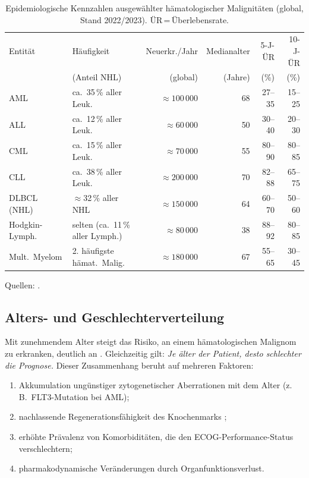 ﻿\documentclass[12pt,a4paper]{article}
\theoremstyle{definition}
\begin{document}
\begin{table}
\centering
\caption{Epidemiologische Kennzahlen ausgewählter hämatologischer Malignitäten
  (global, Stand 2022/2023). ÜR\,=\,Überlebensrate.}
\label{tab:epidemiologie}
\begin{tabular}{@{}llrrrr@{}}
\toprule
Entität & Häufigkeit & Neuerkr./Jahr & Medianalter & 5-J-ÜR & 10-J-ÜR \\
        & (Anteil NHL) & (global) & (Jahre) & (\%) & (\%) \\
\midrule
AML           & ca.\ 35\,\% aller Leuk. & $\approx 100\,000$ & 68 & 27--35 & 15--25 \\
ALL           & ca.\ 12\,\% aller Leuk. & $\approx 60\,000$  & 50 & 30--40 & 20--30 \\
CML           & ca.\ 15\,\% aller Leuk. & $\approx 70\,000$  & 55 & 80--90 & 80--85 \\
CLL           & ca.\ 38\,\% aller Leuk. & $\approx 200\,000$ & 70 & 82--88 & 65--75 \\
DLBCL (NHL)   & $\approx$32\,\% aller NHL & $\approx 150\,000$ & 64 & 60--70 & 50--60 \\
Hodgkin-Lymph.& selten (ca.\ 11\,\% aller Lymph.) & $\approx 80\,000$ & 38 & 88--92 & 80--85 \\
Mult.\ Myelom & 2. häufigste hämat.\ Malig. & $\approx 180\,000$ & 67 & 55--65 & 30--45 \\
\bottomrule
\end{tabular}
\end{table}

\noindent Quellen: \cite{adeyemi2025,siegel2023,bray2018,dohner2017,kumar2017,coiffier2002,hochhaus2017}.

\subsection{Alters- und Geschlechterverteilung}

Mit zunehmendem Alter steigt das Risiko, an einem hämatologischen Malignom zu
erkranken, deutlich an \cite{deschler2006}. Gleichzeitig gilt: \emph{Je älter der
Patient, desto schlechter die Prognose.} Dieser Zusammenhang beruht auf mehreren
Faktoren:
\begin{enumerate}
  \item Akkumulation ungünstiger zytogenetischer Aberrationen mit dem Alter
        (z.\,B.\ FLT3-Mutation bei AML);
  \item nachlassende Regenerationsfähigkeit des Knochenmarks \cite{appelbaum2006};
  \item erhöhte Prävalenz von Komorbiditäten, die den ECOG-Performance-Status
        \cite{oken1982} verschlechtern;
  \item pharmakodynamische Veränderungen durch Organfunktionsverlust.
\end{enumerate}
\end{document}
